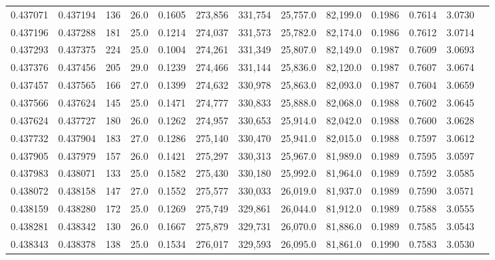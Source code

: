 \begin{tabular}{rrrrrrrrrrrrr}
0.437071 & 0.437194 &   136 & 26.0 &                                     0.1605 & 273,856 & 331,754 &  25,757.0 &  82,199.0 & 0.1986 & 0.7614 & 3.0730 \\
0.437196 & 0.437288 &   181 & 25.0 &                                     0.1214 & 274,037 & 331,573 &  25,782.0 &  82,174.0 & 0.1986 & 0.7612 & 3.0714 \\
0.437293 & 0.437375 &   224 & 25.0 &                                     0.1004 & 274,261 & 331,349 &  25,807.0 &  82,149.0 & 0.1987 & 0.7609 & 3.0693 \\
0.437376 & 0.437456 &   205 & 29.0 &                                     0.1239 & 274,466 & 331,144 &  25,836.0 &  82,120.0 & 0.1987 & 0.7607 & 3.0674 \\
0.437457 & 0.437565 &   166 & 27.0 &                                     0.1399 & 274,632 & 330,978 &  25,863.0 &  82,093.0 & 0.1987 & 0.7604 & 3.0659 \\
0.437566 & 0.437624 &   145 & 25.0 &                                     0.1471 & 274,777 & 330,833 &  25,888.0 &  82,068.0 & 0.1988 & 0.7602 & 3.0645 \\
0.437624 & 0.437727 &   180 & 26.0 &                                     0.1262 & 274,957 & 330,653 &  25,914.0 &  82,042.0 & 0.1988 & 0.7600 & 3.0628 \\
0.437732 & 0.437904 &   183 & 27.0 &                                     0.1286 & 275,140 & 330,470 &  25,941.0 &  82,015.0 & 0.1988 & 0.7597 & 3.0612 \\
0.437905 & 0.437979 &   157 & 26.0 &                                     0.1421 & 275,297 & 330,313 &  25,967.0 &  81,989.0 & 0.1989 & 0.7595 & 3.0597 \\
0.437983 & 0.438071 &   133 & 25.0 &                                     0.1582 & 275,430 & 330,180 &  25,992.0 &  81,964.0 & 0.1989 & 0.7592 & 3.0585 \\
0.438072 & 0.438158 &   147 & 27.0 &                                     0.1552 & 275,577 & 330,033 &  26,019.0 &  81,937.0 & 0.1989 & 0.7590 & 3.0571 \\
0.438159 & 0.438280 &   172 & 25.0 &                                     0.1269 & 275,749 & 329,861 &  26,044.0 &  81,912.0 & 0.1989 & 0.7588 & 3.0555 \\
0.438281 & 0.438342 &   130 & 26.0 &                                     0.1667 & 275,879 & 329,731 &  26,070.0 &  81,886.0 & 0.1989 & 0.7585 & 3.0543 \\
0.438343 & 0.438378 &   138 & 25.0 &                                     0.1534 & 276,017 & 329,593 &  26,095.0 &  81,861.0 & 0.1990 & 0.7583 & 3.0530 \\

\end{tabular}
